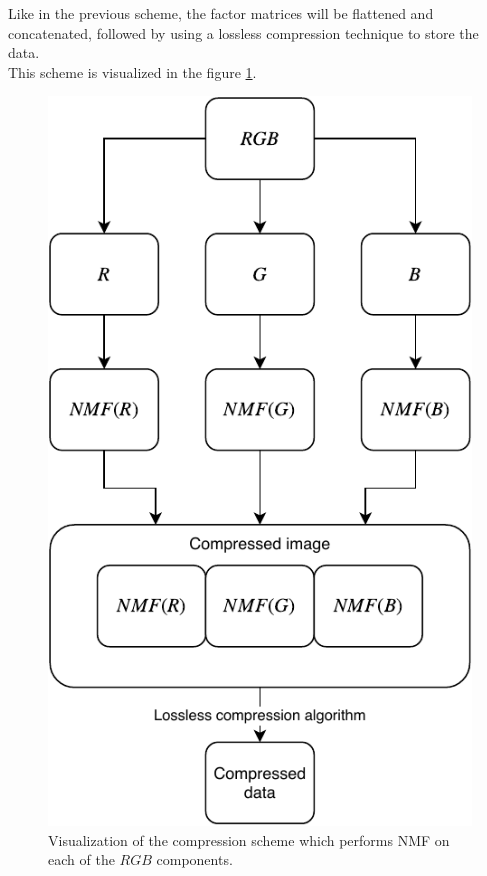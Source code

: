 \documentclass[thesis=M,english]{FITthesis}[2012/10/20]
\begin{document}
Like in the previous scheme, the factor matrices will be flattened and concatenated,
followed by using a lossless compression technique to store the data.
\\

This scheme is visualized in the figure \ref{fig:nmf-rgbseparate-scheme}.

\begin{figure}[h]
  \centering
  \includegraphics{drawio/comprseparatergb}
  \caption{Visualization of the compression scheme which performs NMF on each of the
  $RGB$ components.}
  \label{fig:nmf-rgbseparate-scheme}
\end{figure}
\end{document}
